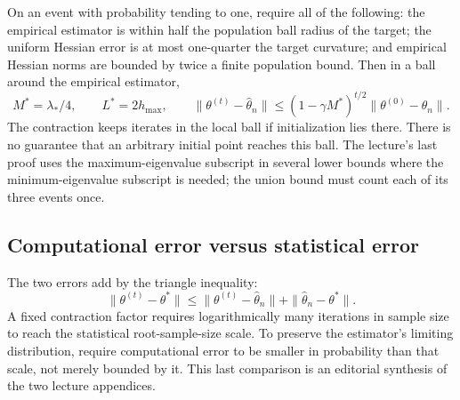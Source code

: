 \documentclass[12pt]{article}
\begin{document}
On an event with probability tending to one, require all of the following:
the empirical estimator is within half the population ball radius of the
target; the uniform Hessian error is at most one-quarter the target
curvature; and empirical Hessian norms are bounded by twice a finite
population bound. Then in a ball around the empirical estimator,
\begin{equation}
 M^*=\lambda_*/4,\qquad L^*=2h_{\max},\qquad
 \|\theta^{(t)}-\widehat\theta_n\|
 \le(1-\gamma M^*)^{t/2}\|\theta^{(0)}-\widehat\theta_n\|.
\end{equation}
The contraction keeps iterates in the local ball if initialization lies
there. There is no guarantee that an arbitrary initial point reaches this
ball. The lecture's last proof uses the maximum-eigenvalue subscript in
several lower bounds where the minimum-eigenvalue subscript is needed;
the union bound must count each of its three events once.

\subsection{Computational error versus statistical error}
The two errors add by the triangle inequality:
\begin{equation}
 \|\theta^{(t)}-\theta^*\|
 \le\|\theta^{(t)}-\widehat\theta_n\|
 +\|\widehat\theta_n-\theta^*\|.
\end{equation}
A fixed contraction factor requires logarithmically many iterations in
sample size to reach the statistical root-sample-size scale. To preserve
the estimator's limiting distribution, require computational error to be
smaller in probability than that scale, not merely bounded by it. This
last comparison is an editorial synthesis of the two lecture appendices.
\end{document}
